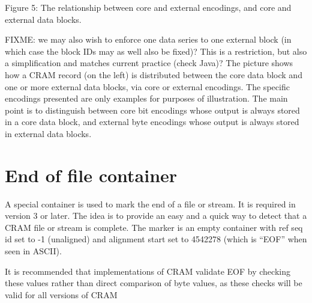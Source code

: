 \documentclass[a4paper]{article}
\begin{document}
\begin{center}

Figure 5: The relationship between core and external encodings, and core and external data blocks.

\end{center}

{\color{gray}
FIXME: we may also wish to enforce one data series to one external
block (in which case the block IDs may as well also be fixed)?  This
is a restriction, but also a simplification and matches current
practice (check Java)?
}
The picture shows how a CRAM record (on the left) is distributed between the core 
data block and one or more external data blocks, via core or external encodings. The specific 
encodings presented are only examples for purposes of illustration. The main point is 
to distinguish between core bit encodings whose output is always stored in a core data 
block, and external byte encodings whose output is always stored in external data 
blocks.

\section{\textbf{End of file container}}

A special container is used to mark the end of a file or stream. It is required in version 3 or later.
The idea is to provide an easy and a quick way to detect that a CRAM file or stream is complete.
The marker is an empty container with ref seq id set to -1 (unaligned) and alignment start set to 4542278 (which is ``EOF'' when seen in ASCII).

It is recommended that implementations of CRAM validate EOF by checking these values rather than direct comparison of byte values, as these checks will be valid for all versions of CRAM
\end{document}
